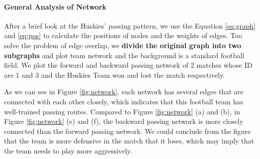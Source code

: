 \documentclass[12pt]{mcmthesis}
\begin{document}
\paragraph{General Analysis of Network}
After a brief look at the Huskies' passing pattern, we use the Equation \ref{eq:graph} and \ref{eq:pos} to calculate the positions of nodes and the weights of edges. Too solve the problem of edge overlap, we \textbf{divide the original graph into two subgraphs} and plot team network and the background is a standard football field. We plot the forward and backward passing network of 2 matches whose ID are 1 and 3 and the Huskies Team won and lost the match respectively.

As we can see in Figure \ref{fig:network}, each network has several edges that are connected with each other closely, which indicates that this football team has well-trained passing routes. Compared to Figure \ref{fig:network} (a) and (b), in Figure \ref{fig:network} (e) and (f), the backward passing network is more closely connected than the forward passing network. We could conclude from the figure that the team is more defensive in the match that it loses, which may imply that the team needs to play more aggressively.~\cite{gursakal}
\end{document}
